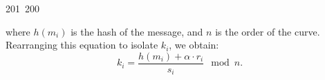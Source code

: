 201~200~\documentclass{article}
\begin{document}
	                                                                        	                                                                    	                                	                    	                    	                        	                        	                    	                                                                	                	                                                                    	                    		where $h(m_i)$ is the hash of the message, and $n$ is the order of the curve. Rearranging this equation to isolate $k_i$, we obtain:
	                                                                        	                                                                    	                                	                    	                    	                        	                        	                    	                                                                	                	                                                                    	                    		\[
	                                                                        	                                                                    	                                	                    	                    	                        	                        	                    	                                                                	                	                                                                    	                    			k_i = \frac{h(m_i) + \alpha \cdot r_i}{s_i} \mod n.
	                                                                        	                                                                    	                                	                    	                    	                        	                        	                    	                                                                	                	                                                                    	                    			\]
\end{document}
